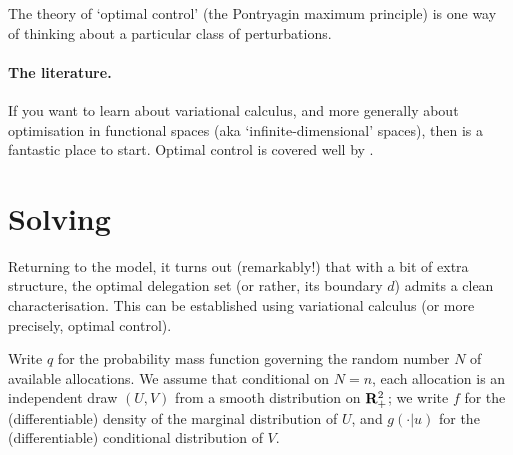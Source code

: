 The theory of `optimal control' (the Pontryagin maximum principle) is one way of thinking about a particular class of perturbations.

\paragraph{The literature.}
If you want to learn about variational calculus, and more generally about optimisation in functional spaces (aka `infinite-dimensional' spaces),
then \textcite{Luenberger1969} is a fantastic place to start.
Optimal control is covered well by \textcite{SeierstadSydsaeter1987}.



\section{Solving}
\label{sec:ch4:solving}

Returning to the model, it turns out (remarkably!) that with a bit of extra structure,
the optimal delegation set (or rather, its boundary $d$) admits a clean characterisation.
This can be established using variational calculus (or more precisely, optimal control).

Write $q$ for the probability mass function governing the random number $N$ of available allocations.
We assume that
conditional on $N=n$, each allocation is an independent draw $(U,V)$ from a smooth distribution on $\mathbf{R}_+^2$;
we write $f$ for the (differentiable) density of the marginal distribution of $U$,
and $g(\cdot|u)$ for the (differentiable) conditional distribution of $V$.

